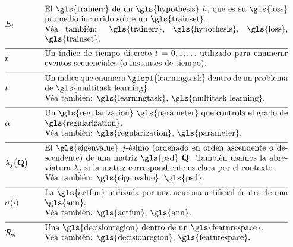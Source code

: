 \begin{align}                          
	&\trainerror &\quad &\parbox{.85\textwidth}{El \gls{trainerr} de un \gls{hypothesis} $\hypothesis$, que es su 
		\gls{loss} promedio incurrido sobre un \gls{trainset}.
		\\ Véa también: \gls{trainerr}, \gls{hypothesis}, \gls{loss}, \gls{trainset}.} \nonumber \\[2mm] \hline \nonumber\\[-5mm]
	&\timeidx &\quad &\parbox{.85\textwidth}{Un índice de tiempo discreto $\timeidx=0, 1, \ldots$ utilizado para 
		enumerar eventos secuenciales (o instantes de tiempo).} \nonumber \\[2mm] \hline \nonumber\\[-5mm]
	&\taskidx &\quad &\parbox{.85\textwidth}{Un índice que enumera
		\glspl{learningtask} dentro de un problema de \gls{multitask learning}.
		\\ Véa también: \gls{learningtask}, \gls{multitask learning}.} \nonumber \\[2mm] \hline \nonumber\\[-5mm]
	&\regparam &\quad &\parbox{.85\textwidth}{Un \gls{regularization} \gls{parameter} que controla 
		el grado de \gls{regularization}.
		\\ Véa también: \gls{regularization}, \gls{parameter}.} \nonumber \\[2mm] \hline \nonumber\\[-5mm]
	&\eigval{\featureidx}\big( \mathbf{Q} \big) &\quad &\parbox{.85\textwidth}{El \gls{eigenvalue} $\featureidx$-ésimo 
		(ordenado en orden ascendente o descendente) de una matriz \gls{psd} $\mathbf{Q}$. También 
		usamos la abreviatura $\eigval{\featureidx}$ si la matriz correspondiente es clara por el contexto.
		\\ Véa también: \gls{eigenvalue}, \gls{psd}.} \nonumber \\[2mm] \hline \nonumber\\[-5mm]
	&\actfun(\cdot) &\quad &\parbox{.85\textwidth}{La \gls{actfun} utilizada por una neurona artificial dentro de una \gls{ann}.
		\\ Véa también: \gls{actfun}, \gls{ann}.} \nonumber \\[2mm] \hline \nonumber\\[-5mm]
	&\decreg{\hat{\truelabel}} &\quad &\parbox{.85\textwidth}{Una \gls{decisionregion} dentro de un \gls{featurespace}.
		\\ Véa también: \gls{decisionregion}, \gls{featurespace}.} \nonumber 
\end{align}     

